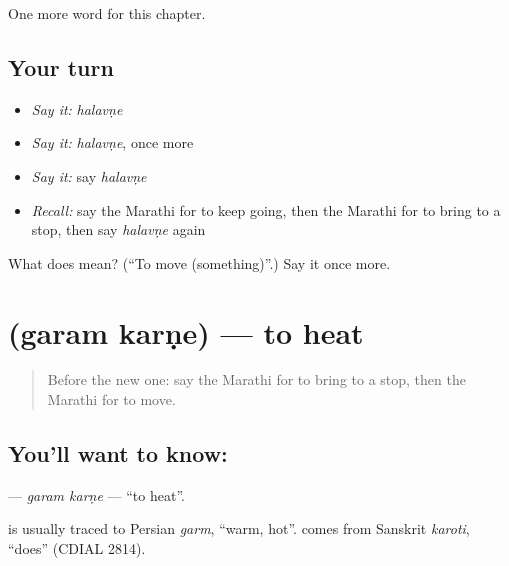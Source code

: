 \begin{grammarlens}[title={What you've built}]
One more word for this chapter.
\end{grammarlens}

\subsection*{Your turn}
\begin{itemize}
\raggedright
  \item \emph{Say it:} \emph{halavṇe}
  \item \emph{Say it:} \emph{halavṇe}, once more
  \item \emph{Say it:} say \emph{halavṇe}
  \item \emph{Recall:} say the Marathi for to keep going, then the Marathi for to bring to a stop, then say \emph{halavṇe} again
\end{itemize}

\begin{tcolorbox}[breakable,colback=teal!4,colframe=teal!35!black,title={Before you move on}]
What does  mean? (\textquotedblleft{}To move (something)\textquotedblright{}.) Say it once more.
\end{tcolorbox}
\section[\texorpdfstring{\mr{गरम} \mr{करणे} (garam karṇe)}{गरम करणे (garam karṇe)}]{  (garam karṇe) — to heat}

\label{lesson:MR-C251-garam-karne}



\begin{quote}
Before the new one: say the Marathi for to bring to a stop, then the Marathi for to move.
\end{quote}

\subsection*{You'll want to know:  }
\textbf{ } — \emph{garam karṇe} — \textquotedblleft{}to heat\textquotedblright{}.

\begin{cousinweb}
\textbf{} is usually traced to Persian \emph{garm}, \textquotedblleft{}warm, hot\textquotedblright{}. \textbf{} comes from Sanskrit \emph{karoti}, \textquotedblleft{}does\textquotedblright{} (CDIAL 2814).
\end{cousinweb}

